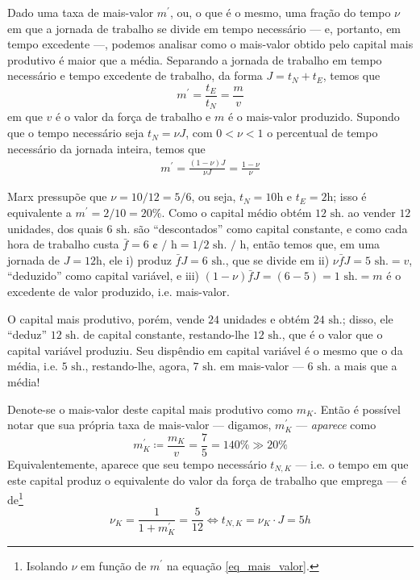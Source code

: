 Dado uma taxa de mais-valor $m^\prime$, ou, o que é o mesmo, uma fração do tempo $\nu$ em que a jornada de trabalho se divide em tempo necessário --- e, portanto, em tempo excedente ---, podemos analisar como o mais-valor obtido pelo capital mais produtivo é maior que a média. Separando a jornada de trabalho em tempo necessário e tempo excedente de trabalho, da forma $J = t_N + t_E$, temos que
$$
m^\prime = \frac{t_E}{t_N} = \frac{m}{v}
$$
em que $v$ é o valor da força de trabalho e $m$ é o mais-valor produzido. Supondo que o tempo necessário seja $t_N = \nu J$, com $0 < \nu < 1$ o percentual de tempo necessário da jornada inteira, temos que
\begin{align}
    \label{eq_mais_valor}
    m^\prime = \frac{(1-\nu) J}{\nu J} = \frac{1-\nu}{\nu}
\end{align}

Marx pressupõe que $\nu = 10/12 = 5/6$, ou seja, $t_N = 10$h e $t_E=2$h; isso é equivalente a $m^\prime = 2/10 = 20\%$. Como o capital médio obtém $12\text{ sh.}$ ao vender $12$ unidades, dos quais $6\text{ sh.}$ são ``descontados'' como capital constante, e como cada hora de trabalho custa $\bar{f} = 6\text{ ¢ / h} = 1/2\text{ sh. / h}$, então temos que, em uma jornada de $J=12$h, ele i) produz $\bar{f} J = 6\text{ sh.}$, que se divide em ii) $\nu \bar{f}J = 5\text{ sh.} = v$, ``deduzido'' como capital variável, e iii) $(1-\nu) \bar{f} J = (6-5)=1\text{ sh.} = m$ é o excedente de valor produzido, i.e. mais-valor. 

O capital mais produtivo, porém, vende $24$ unidades e obtém $24\text{ sh.}$; disso, ele ``deduz'' $12\text{ sh.}$ de capital constante, restando-lhe $12\text{ sh.}$, que é o valor que o capital variável produziu. Seu dispêndio em capital variável é o mesmo que o da média, i.e. $5\text{ sh.}$, restando-lhe, agora, $7\text{ sh.}$ em mais-valor --- $6\text{ sh.}$ a mais que a média! 

Denote-se o mais-valor deste capital mais produtivo como $m_K$. Então é possível notar que sua própria taxa de mais-valor --- digamos, $m_K^\prime$ --- \textit{aparece} como
$$
m_K^\prime \coloneqq \frac{m_K}{v} = \frac{7}{5} = 140\%  \gg 20\%
$$
Equivalentemente, aparece que seu tempo necessário $t_{N, K}$ --- i.e. o tempo em que este capital produz o equivalente do valor da força de trabalho que emprega --- é de\footnote{Isolando $\nu$ em função de $m^\prime$ na equação \ref{eq_mais_valor}.}
$$
\nu_K = \frac{1}{1 + m_K^\prime} = \frac{5}{12} \iff t_{N, K} = \nu_K \cdot J = 5h
$$

